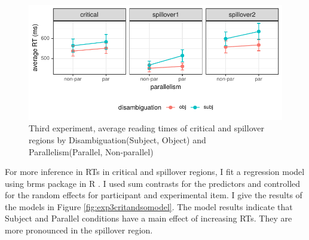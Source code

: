 \begin{knitrout}
\color{fgcolor}\begin{figure}[hbt!]

{\centering \includegraphics[]{experiments/equivalance/report/figure/exp3critandso-1.pdf} 

}

\caption[Third experiment, average reading times of critical and spillover regions by Disambiguation(Subject, Object) and Parallelism(Parallel, Non-parallel)]{Third experiment, average reading times of critical and spillover regions by Disambiguation(Subject, Object) and Parallelism(Parallel, Non-parallel)}\label{fig:exp3critandso}
\end{figure}


\end{knitrout}

For more inference in RTs in critical and spillover regions, I fit a regression model using brms package in R \citep{burkner2017brms}. I used sum contrasts for the predictors and controlled for the random effects for participant and experimental item. I give the results of the models in Figure \ref{fig:exp3critandsomodel}. The model results indicate that Subject and Parallel conditions have a main effect of increasing RTs. They are more pronounced in the spillover region.

